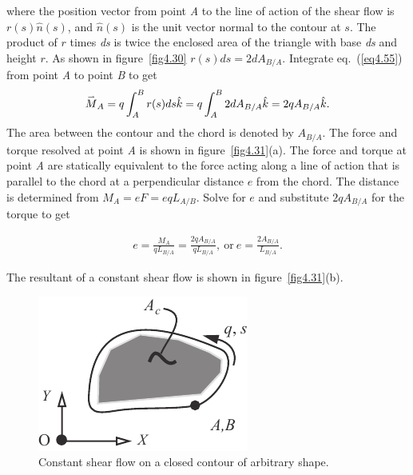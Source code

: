 \documentclass{AeroStructure-ERJohnson}
\def\harp#1{\smash{\mathord{\buildrel{\lower3pt\hbox{$\scriptscriptstyle\rightharpoonup$}}\over{#1}}}}
\begin{document}
\noindent where the position vector from point \textit{A} to the line of action of the shear flow is $r(s) \hat{n}(s)$, and $\hat{n}(s)$ is the unit vector normal to the contour at $s$. The product of $r$ times \textit{ds} is twice the enclosed area of the triangle with base \textit{ds} and height $r$. As shown in figure~\ref{fig4.30} $r(s) d s=2 d A_{B/A}$. Integrate eq.~(\ref{eq4.55}) from point \textit{A} to point \textit{B} to get
\begin{align}\label{eq4.56}
\harp{M}_{A}=q \int_{A}^{B} r(s) d s \hat{k}=q \int_{A}^{B} 2 d A_{B/A} \hat{k}=2 q A_{B/A} \hat{k}.
\end{align}
The area between the contour and the chord is denoted by $A_{B/A}$. The force and torque resolved at point \textit{A} is shown in figure~\ref{fig4.31}(a). The force and torque at point \textit{A} are statically equivalent to the force acting along a line of action that is parallel to the chord at a perpendicular distance $e$ from the chord. The distance is determined from $M_{A}=e F=e q L_{A/B}$. Solve for $e$ and substitute $2 q A_{B/A}$ for the torque to get
{\def\thefigure{4.31}
}

\vspace*{-2\baselineskip}
\begin{align}\label{eq4.57}
e=\frac{M_{A}}{q L_{B/A}}=\frac{2 q A_{B/A}}{q L_{B/A}},\ \text{or}\ e=\frac{2 A_{B/A}}{L_{B/A}}.
\end{align}


\noindent The resultant of a constant shear flow is shown in figure~\ref{fig4.31}(b).


\begin{figure}
\vspace{-32pt}
\includegraphics{Figure_4-32.pdf}
\caption{Constant shear flow on a closed contour of arbitrary shape.\label{fig4.32}}
\end{figure}
\end{document}
